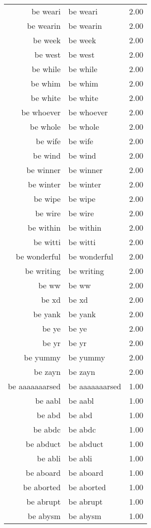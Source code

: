 \begin{table}[ht]
\begin{tabular}{rlr}
  be weari & be weari & 2.00 \\ 
  be wearin & be wearin & 2.00 \\ 
  be week & be week & 2.00 \\ 
  be west & be west & 2.00 \\ 
  be while & be while & 2.00 \\ 
  be whim & be whim & 2.00 \\ 
  be white & be white & 2.00 \\ 
  be whoever & be whoever & 2.00 \\ 
  be whole & be whole & 2.00 \\ 
  be wife & be wife & 2.00 \\ 
  be wind & be wind & 2.00 \\ 
  be winner & be winner & 2.00 \\ 
  be winter & be winter & 2.00 \\ 
  be wipe & be wipe & 2.00 \\ 
  be wire & be wire & 2.00 \\ 
  be within & be within & 2.00 \\ 
  be witti & be witti & 2.00 \\ 
  be wonderful & be wonderful & 2.00 \\ 
  be writing & be writing & 2.00 \\ 
  be ww & be ww & 2.00 \\ 
  be xd & be xd & 2.00 \\ 
  be yank & be yank & 2.00 \\ 
  be ye & be ye & 2.00 \\ 
  be yr & be yr & 2.00 \\ 
  be yummy & be yummy & 2.00 \\ 
  be zayn & be zayn & 2.00 \\ 
  be aaaaaaarsed & be aaaaaaarsed & 1.00 \\ 
  be aabl & be aabl & 1.00 \\ 
  be abd & be abd & 1.00 \\ 
  be abdc & be abdc & 1.00 \\ 
  be abduct & be abduct & 1.00 \\ 
  be abli & be abli & 1.00 \\ 
  be aboard & be aboard & 1.00 \\ 
  be aborted & be aborted & 1.00 \\ 
  be abrupt & be abrupt & 1.00 \\ 
  be abysm & be abysm & 1.00 \\ 

\end{tabular}
\end{table}
